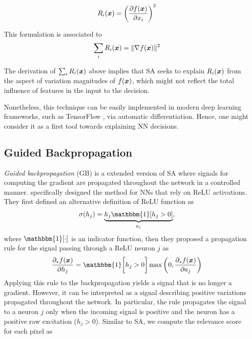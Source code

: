 \begin{align*}
	R_i(\x) =
	 \bigg( \frac{\partial f(\patvector{x})}{ \partial x_i } \bigg)^2
\end{align*}
	
This formulation is associated to
\begin{align*}
	\sum_i R_i(\x) = \| \nabla f(\patvector{x}) \|^2
\end{align*}

The derivation of $\sum_i R_i(\boldsymbol{x})$ above implies that SA seeks to explain $R_i(\boldsymbol{x})$ from the aspect of variation magnitudes of $f(\boldsymbol{x})$, which might not reflect the total influence of features in the input to the decision.

Nonetheless, this technique can be easily implemented in modern deep learning frameworks, such as TensorFlow \citep{AbadiTensorFlowLargeScaleMachine2016}, via automatic differentiation. Hence, one might consider it as a first tool towards explaining NN decisions.

\subsection{Guided Backpropagation}
\textit{Guided backpropagation} (GB) is a extended version of SA where signals for computing the gradient are propagated throughout the network in a controlled manner. \citet{SpringenbergStrivingSimplicityAll2015a} specifically designed the method for NNs that rely on ReLU activations.  They first defined an alternative definition  of ReLU function as
\begin{align*}
	\sigma(h_j) = \underbrace{h_j \mathbbm{1}[ h_j > 0 ]}_{a_j},
\end{align*}
where $\mathbbm{1}[ \cdot ]$  is an indicator function, then they proposed a  propagation rule for the signal passing through a ReLU neuron $j$ as
\begin{align*}
	\frac{\partial_* f(\patvector{x}) }{ \partial h_j } = \mathbbm{1}\bigg[h_j > 0 \bigg] \max \bigg(0, \frac{ \partial_* f(\patvector{x}) }{ \partial a_j } \bigg)
\end{align*}
Applying this rule to the backpropagation yields a signal that is no longer a gradient. However, it can be interpreted as a signal describing positive variations propagated throughout the network. In particular, the rule propagates the signal to a neuron $j$ only when the incoming signal is positive and the neuron has a positive raw excitation ($h_j > 0$). Similar to SA, we compute the relevance score for each pixel  as 

